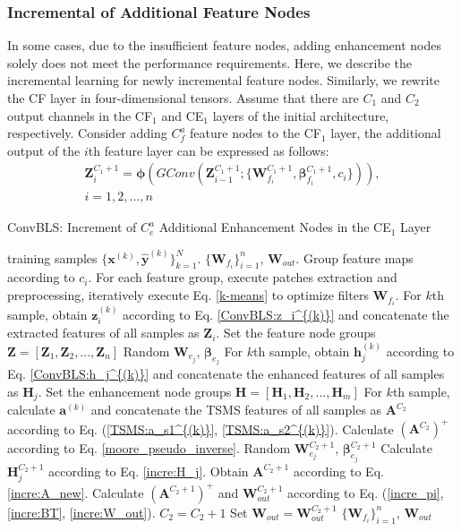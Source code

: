 \documentclass[lettersize,journal]{IEEEtran}
\begin{document}
\subsubsection{Incremental of Additional Feature Nodes}
In some cases, due to the insufficient feature nodes, adding enhancement nodes solely does not meet the performance requirements. Here, we describe the incremental learning for newly incremental feature nodes. Similarly, we rewrite the CF layer in four-dimensional tensors. Assume that there are $C_1$ and $C_2$ output channels in the CF$_1$ and CE$_1$ layers of the initial architecture, respectively. Consider adding $C^a_f$ feature nodes to the CF$_1$ layer, the additional output of the $i$th feature layer can be expressed as follows:
\begin{multline}
\label{FeaIncre:Z_i}
    \bm{Z}_{i}^{C_1+1} = \bm{\phi} (GConv(\bm{Z}_{i-1}^{C_1+1}; \{ \bm{W}_{f_i}^{C_1+1}, \bm{\beta}_{f_i}^{C_1+1}, c_i \})), \\
    i=1,2,...,n
\end{multline}
\begin{algorithm}[H]
\renewcommand{\algorithmicrequire}{\textbf{Input:}}
\renewcommand{\algorithmicensure}{\textbf{Output:}}
\caption{ConvBLS: Increment of $C^a_e$ Additional Enhancement Nodes in the CE$_1$ Layer}
\label{alg:EnhancementIncremental}
\begin{algorithmic}[1]
\REQUIRE training samples $\{\textbf{x}^{(k)}, \hat{\textbf{y}}^{(k)}\}_{k=1}^{N}$.
\ENSURE $\{\textbf{W}_{f_i}\}_{i=1}^{n}$, $\textbf{W}_{out}$.
\STATE Group feature maps according to $c_i$. For each feature group, execute patches extraction and preprocessing, iteratively execute Eq. \eqref{k-means} to optimize filters $\textbf{W}_{f_i}$.
\STATE For $k$th sample, obtain $\textbf{z}_i^{(k)}$ according to Eq. \eqref{ConvBLS:z_i^{(k)}} and concatenate the extracted features of all samples as $\textbf{Z}_i$.
\ENDFOR
\STATE Set the feature node groups $\mathbf{Z}=[\textbf{Z}_1,\textbf{Z}_2,...,\textbf{Z}_n]$
\STATE Random $\textbf{W}_{e_j}$, $\mathbf{\beta}_{e_j}$
\STATE For $k$th sample, obtain $\textbf{h}_j^{(k)}$ according to Eq. \eqref{ConvBLS:h_j^{(k)}} and concatenate the enhanced features of all samples as $\textbf{H}_j$. 
\ENDFOR
\STATE Set the enhancement node groups $\textbf{H}=[\textbf{H}_1,\textbf{H}_2,...,\textbf{H}_m]$
\STATE For $k$th sample, calculate  $\mathbf{a}^{(k)}$ and concatenate the TSMS features of all samples as $\mathbf{A}^{C_2}$ according to Eq. (\ref{TSMS:a_s1^{(k)}}, \ref{TSMS:a_s2^{(k)}}).
\STATE Calculate $(\mathbf{A}^{C_2})^{+}$ according to Eq. \eqref{moore_pseudo_inverse}.
\STATE Random $\textbf{W}_{e_j}^{C_2+1}$, $\mathbf{\beta}_{e_j}^{C_2+1}$
\STATE Calculate $\mathbf{H}_{j}^{C_2+1}$ according to Eq. \eqref{incre:H_j}.
\ENDFOR
\STATE Obtain $\mathbf{A}^{C_2+1}$ according to Eq. \eqref{incre:A_new}. Calculate $(\mathbf{A}^{C_2+1})^{+}$ and $\mathbf{W}_{out}^{C_2+1}$ according to Eq. (\ref{incre_pi}, \ref{incre:BT}, \ref{incre:W_out}).
\STATE $C_2=C_2+1$
\ENDWHILE
\STATE Set $\mathbf{W}_{out}=\mathbf{W}_{out}^{C_2+1}$
\RETURN $\{\textbf{W}_{f_i}\}_{i=1}^{n}$, $\mathbf{W}_{out}$
\end{algorithmic}
\end{algorithm}
\end{document}
